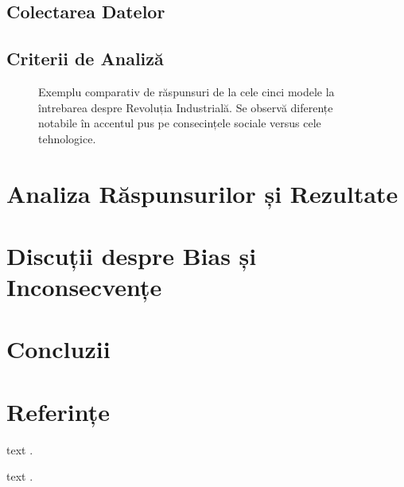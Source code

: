 \documentclass[a4paper, 10pt, twocolumn]{article}
\begin{document}
\subsection{Colectarea Datelor}

\subsection{Criterii de Analiză}

\begin{figure*}[t!]
    \centering
    \caption{Exemplu comparativ de răspunsuri de la cele cinci modele la întrebarea despre Revoluția Industrială. Se observă diferențe notabile în accentul pus pe consecințele sociale versus cele tehnologice.}
    \label{fig:wide_comparison}
\end{figure*}

\section{Analiza Răspunsurilor și Rezultate}

\section{Discuții despre Bias și Inconsecvențe}

\section{Concluzii}

\section*{Referințe}
\begin{thebibliography}{9}
    \bibitem{}
    text
    \textit{}.

    \bibitem{}
    text
    \textit{}.
\end{thebibliography}
\end{document}
